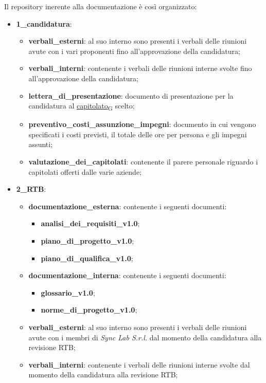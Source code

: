 Il repository inerente alla documentazione è così organizzato:
\begin{itemize}
	\item \textbf{1\_candidatura}:
	\begin{itemize}
		\item \textbf{verbali\_esterni}: al suo interno sono presenti i verbali delle riunioni avute con i vari proponenti fino all'approvazione della candidatura;
		\item \textbf{verbali\_interni}: contenente i verbali delle riunioni interne svolte fino all'approvazione della candidatura;
		\item \textbf{lettera\_di\_presentazione}: documento di presentazione per la candidatura al \href{https://7last.github.io/docs/pb/documentazione-interna/glossario\#capitolato}{capitolato\textsubscript{G}} scelto;
		\item \textbf{preventivo\_costi\_assunzione\_impegni}: documento in cui vengono specificati i costi previsti, il totale delle ore per persona e gli impegni assunti;
		\item \textbf{valutazione\_dei\_capitolati}: contenente il parere personale riguardo i capitolati offerti dalle varie aziende;
	\end{itemize}
	\item \textbf{2\_RTB}:
	\begin{itemize}
		\item \textbf{documentazione\_esterna}: contenente i seguenti documenti:
		\begin{itemize}
			\item \textbf{analisi\_dei\_requisiti\_v1.0};
			\item \textbf{piano\_di\_progetto\_v1.0};
			\item \textbf{piano\_di\_qualifica\_v1.0};
		\end{itemize}
		\item \textbf{documentazione\_interna}: contenente i seguenti documenti:
		\begin{itemize}
			\item \textbf{glossario\_v1.0};
			\item \textbf{norme\_di\_progetto\_v1.0};
		\end{itemize}
		\item \textbf{verbali\_esterni}: al suo interno sono presenti i verbali delle riunioni avute con i membri di \textit{Sync Lab S.r.l.} dal momento della candidatura alla revisione RTB;
		\item \textbf{verbali\_interni}: contenente i verbali delle riunioni interne svolte dal momento della candidatura alla revisione RTB;

\end{itemize}
\end{itemize}
